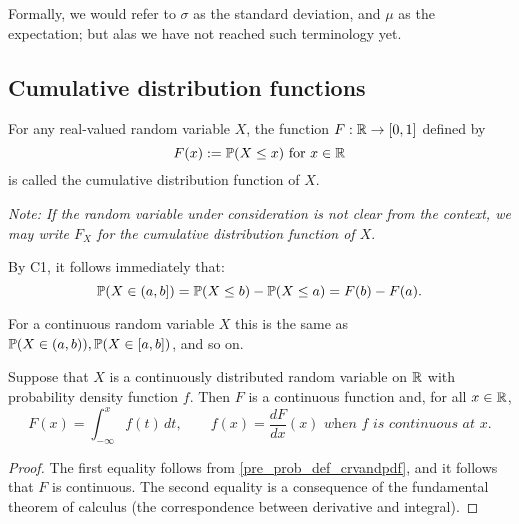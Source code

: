 \documentclass[10pt, a4paper]{article}
\begin{document}
Formally,
we would refer to $\sigma$ as the standard deviation,
and $\mu$ as the expectation;
but alas we have not reached such terminology yet.

\subsection{Cumulative distribution functions}
\begin{definition}
    For any real-valued random variable $X$,
    the function $F: \R \rightarrow [0, 1]$ defined by
    \[
    F(x) := \P(X \leq x)\text{ for } x \in \R
    \]
    is called the cumulative distribution function of $X$.
\end{definition}

\textit{Note: If the random variable under consideration is not clear from the context,
we may write $F_X$ for the cumulative distribution function of $X$}.

By C1,
it follows immediately that:
\[
\P(X \in (a, b]) = \P(X \leq b) - \P(X \leq a) = F(b) - F(a).
\]

For a continuous random variable $X$ this is the same as $\P(X \in (a, b)), \P(X \in [a, b])$,
and so on.

\begin{theorem}
    Suppose that $X$ is a continuously distributed random variable on $\R$ with probability density function $f$.
    Then $F$ is a continuous function and,
    for all $x \in \R$,
    \[
    F(x) = \int_{-\infty}^{x}f(t)\,dt,\qquad f(x) = \frac{dF}{dx}(x)\textit{ when $f$ is continuous at $x$}.
    \]
    \begin{proof}
        The first equality follows from \autoref{pre_prob_def_crvandpdf},
        and it follows that $F$ is continuous.
        The second equality is a consequence of the fundamental theorem of calculus (the correspondence between derivative and integral).
    \end{proof}
\end{theorem}
\end{document}
